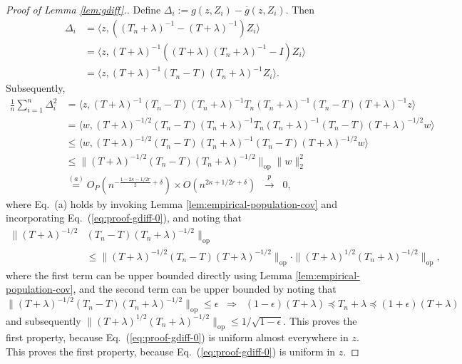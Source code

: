 \documentclass[11pt,a4paper]{article}
\renewcommand{\bar}{\overline}
\theoremstyle{definition}
\theoremstyle{plain}
\theoremstyle{remark}
\newcommand{\op}{\mathrm{op}}
\newcommand{\pd}[1]{
	{ \color{blue} PD: #1}
}
\begin{document}
\begin{proof}[Proof of Lemma \ref{lem:gdiff}.]
Define $\Delta_i := g(z,Z_i)-\bar g(z,Z_i)$. Then
\begin{align*}
\Delta_i &= \langle z,((T_n+\lambda )^{-1}-(T+\lambda )^{-1})Z_i\rangle\nonumber\\
&= \langle z, (T+\lambda )^{-1}((T+\lambda )(T_n+\lambda )^{-1}-I)Z_i\rangle\nonumber\\
&= \langle z, (T+\lambda )^{-1}(T_n-T)(T_n+\lambda )^{-1}Z_i\rangle.
\end{align*}
Subsequently,
\begin{align}
\frac{1}{n}\sum_{i=1}^n \Delta_i^2 &= \langle z, (T+\lambda)^{-1}(T_n-T)(T_n+\lambda)^{-1}T_n(T_n+\lambda)^{-1}(T_n-T)(T+\lambda)^{-1}z\rangle\nonumber\\
&= \langle w, (T+\lambda)^{-1/2}(T_n-T)(T_n+\lambda)^{-1}T_n(T_n+\lambda)^{-1}(T_n-T)(T+\lambda)^{-1/2}w\rangle\nonumber\\
&\leq \langle w, (T+\lambda)^{-1/2}(T_n-T)(T_n+\lambda)^{-1}(T_n-T)(T+\lambda)^{-1/2}w\rangle\nonumber\\
&\leq \|(T+\lambda)^{-1/2}(T_n-T)(T_n+\lambda)^{-1/2}\|_\op\|w\|_2^2\nonumber\\
&\overset{(a)}{=} O_P\left(n^{-\frac{1-2\kappa-1/2r}{2}+\delta}\right)\times O(n^{2\kappa+1/2r+\delta}) \;\;\overset{p}{\to} \;\;0,
\end{align}
where Eq.~(a) holds by invoking Lemma \ref{lem:empirical-population-cov} and incorporating Eq.~(\ref{eq:proof-gdiff-0}), {\color{magenta}and noting that
\begin{align*}
\|(T+\lambda)^{-1/2}&(T_n-T)(T_n+\lambda)^{-1/2}\|_\op \nonumber\\
&\leq \|(T+\lambda)^{-1/2}(T_n-T)(T+\lambda)^{-1/2}\|_\op \cdot \|(T+\lambda)^{1/2}(T_n+\lambda)^{-1/2}\|_\op,
\end{align*}
where the first term can be upper bounded directly using Lemma \ref{lem:empirical-population-cov}, and the second term can be upper bounded by noting that 
$$
\|(T+\lambda)^{-1/2}(T_n-T)(T_n+\lambda)^{-1/2}\|_\op \leq \epsilon \;\;\Longrightarrow\;\; (1-\epsilon)(T+\lambda) \preceq T_n+\lambda \preceq (1+\epsilon)(T+\lambda)
$$
and subsequently $\|(T+\lambda)^{1/2}(T_n+\lambda)^{-1/2}\|_\op \leq 1/\sqrt{1-\epsilon}$.
}
This proves the first property, because Eq.~(\ref{eq:proof-gdiff-0}) is uniform almost everywhere in $z$. This proves the first property, because Eq.~(\ref{eq:proof-gdiff-0}) is uniform in $z$.



\end{proof}
\end{document}
